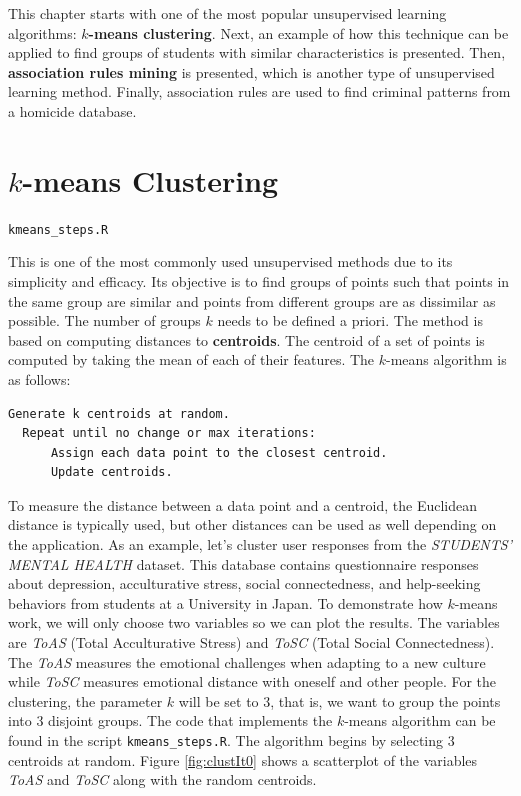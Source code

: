 \documentclass[
  11pt,
]{krantz}
\makeatletter
\newenvironment{kframe}{%
\medskip{}
\setlength{\fboxsep}{.8em}
 \def\at@end@of@kframe{}%
 \ifinner\ifhmode%
  \def\at@end@of@kframe{\end{minipage}}%
  \begin{minipage}{\columnwidth}%
 \fi\fi%
 \def\FrameCommand##1{\hskip\@totalleftmargin \hskip-\fboxsep
 \colorbox{shadecolor}{##1}\hskip-\fboxsep
     \hskip-\linewidth \hskip-\@totalleftmargin \hskip\columnwidth}%
 \MakeFramed {\advance\hsize-\width
   \@totalleftmargin\z@ \linewidth\hsize
   \@setminipage}}%
 {\par\unskip\endMakeFramed%
 \at@end@of@kframe}
\newenvironment{rmdblock}[1]
  {
  \begin{itemize}
  \renewcommand{\labelitemi}{
    \raisebox{-.7\height}[0pt][0pt]{
      {\setkeys{Gin}{width=3em,keepaspectratio}\texttt{[image: images/icons/\#1]}}
    }
  }
  \setlength{\fboxsep}{1em}
  \begin{kframe}
  \item
  }
  {
  \end{kframe}
  \end{itemize}
  }
\newenvironment{rmdfolder}
  {\begin{rmdblock}{folder}}
  {\end{rmdblock}}
\makeatother
\begin{document}
This chapter starts with one of the most popular unsupervised learning algorithms: \textbf{\(k\)-means clustering}. Next, an example of how this technique can be applied to find groups of students with similar characteristics is presented. Then, \textbf{association rules mining} is presented, which is another type of unsupervised learning method. Finally, association rules are used to find criminal patterns from a homicide database.

\hypertarget{k-means-clustering}{%
\section{\texorpdfstring{\(k\)-means Clustering}{k-means Clustering}}\label{k-means-clustering}}

\begin{rmdfolder}
\texttt{kmeans\_steps.R}
\end{rmdfolder}

This is one of the most commonly used unsupervised methods due to its simplicity and efficacy. Its objective is to find groups of points such that points in the same group are similar and points from different groups are as dissimilar as possible. The number of groups \(k\) needs to be defined a priori. The method is based on computing distances to \textbf{centroids}. The centroid of a set of points is computed by taking the mean of each of their features. The \(k\)-means algorithm is as follows:

\begin{verbatim}
Generate k centroids at random.
  Repeat until no change or max iterations:
      Assign each data point to the closest centroid.
      Update centroids.
\end{verbatim}

To measure the distance between a data point and a centroid, the Euclidean distance is typically used, but other distances can be used as well depending on the application. As an example, let's cluster user responses from the \emph{STUDENTS' MENTAL HEALTH} dataset. This database contains questionnaire responses about depression, acculturative stress, social connectedness, and help-seeking behaviors from students at a University in Japan. To demonstrate how \(k\)-means work, we will only choose two variables so we can plot the results. The variables are \emph{ToAS} (Total Acculturative Stress) and \emph{ToSC} (Total Social Connectedness). The \emph{ToAS} measures the emotional challenges when adapting to a new culture while \emph{ToSC} measures emotional distance with oneself and other people. For the clustering, the parameter \(k\) will be set to \(3\), that is, we want to group the points into \(3\) disjoint groups. The code that implements the \(k\)-means algorithm can be found in the script \texttt{kmeans\_steps.R}. The algorithm begins by selecting \(3\) centroids at random. Figure \ref{fig:clustIt0} shows a scatterplot of the variables \emph{ToAS} and \emph{ToSC} along with the random centroids.
\end{document}
